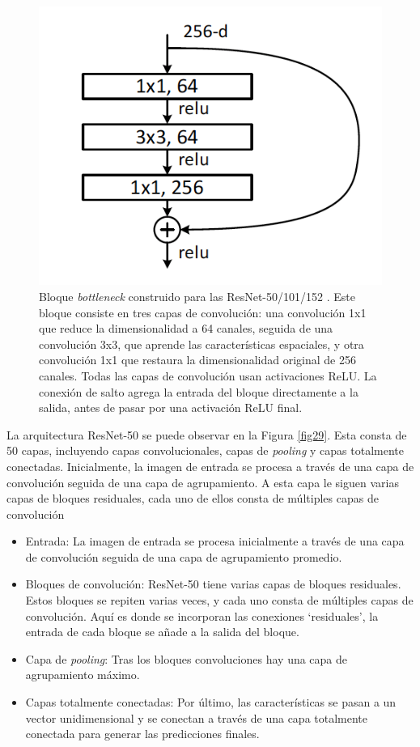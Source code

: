 \begin{figure}[h]
	\centering
	\includegraphics[scale=0.65]{imagenes/cap4/residual_conections.png}
	\caption[Bloque residual ResNet.]{Bloque \textit{bottleneck} construido para las ResNet-50/101/152 \cite{73}. Este bloque consiste en tres capas de convolución: una convolución 1x1 que reduce la dimensionalidad a 64 canales, seguida de una convolución 3x3, que aprende las características espaciales, y otra convolución 1x1 que restaura la dimensionalidad original de 256 canales. Todas las capas de convolución usan activaciones ReLU. La conexión de salto agrega la entrada del bloque directamente a la salida, antes de pasar por una activación ReLU final.}
	\label{fig28}
\end{figure}

La arquitectura ResNet-50 se puede observar en la Figura \ref{fig29}. Esta consta de 50 capas, incluyendo capas convolucionales, capas de \textit{pooling} y capas totalmente conectadas. Inicialmente, la imagen de entrada se procesa a través de una capa de convolución seguida de una capa de agrupamiento. A esta capa le siguen varias capas de bloques residuales, cada uno de ellos consta de múltiples capas de convolución

\begin{itemize}
	\item Entrada: La imagen de entrada se procesa inicialmente a través de una capa de convolución seguida de una capa de agrupamiento promedio.
	\item Bloques de convolución: ResNet-50 tiene varias capas de bloques residuales. Estos bloques se repiten varias veces, y cada uno consta de múltiples capas de convolución. Aquí es donde se incorporan las conexiones \enquote*{residuales}, la entrada de cada bloque se añade a la salida del bloque.
	\item Capa de \textit{pooling}: Tras los bloques convoluciones hay una capa de agrupamiento máximo.
	\item Capas totalmente conectadas: Por último, las características se pasan a un vector unidimensional y se conectan a través de una capa totalmente conectada para generar las predicciones finales.
\end{itemize}

